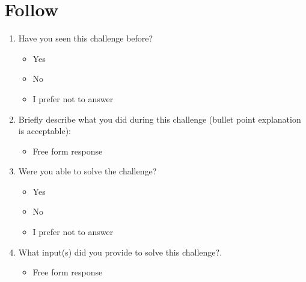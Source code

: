 \section{Follow}
\begin{enumerate}
    \item Have you seen this challenge before?
    \begin{itemize}
        \item Yes
        \item No
        \item I prefer not to answer
    \end{itemize}
    \item Briefly describe what you did during this challenge (bullet point explanation is acceptable):
    \begin{itemize}
        \item Free form response
    \end{itemize}
    \item Were you able to solve the challenge?
    \begin{itemize}
        \item Yes
        \item No
        \item I prefer not to answer
    \end{itemize}
    \item What input(s) did you provide to solve this challenge?.
    \begin{itemize}
        \item Free form response
    \end{itemize}
\end{enumerate}

